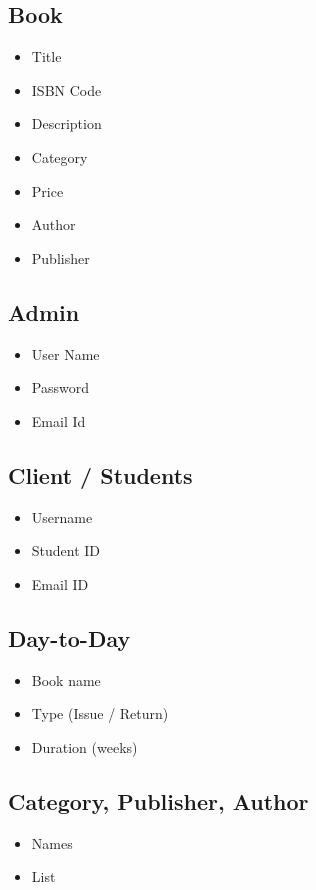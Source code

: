 \documentclass[11pt]{article}
\begin{document}
\subsection{Book}
\label{sec:orge1f6131}
\begin{itemize}
\item Title
\item ISBN Code
\item Description
\item Category
\item Price
\item Author
\item Publisher
\end{itemize}

\subsection{Admin}
\label{sec:orgae946ac}
\begin{itemize}
\item User Name
\item Password
\item Email Id
\end{itemize}

\subsection{Client / Students}
\label{sec:org1ea0c7f}
\begin{itemize}
\item Username
\item Student ID
\item Email ID
\end{itemize}

\subsection{Day-to-Day}
\label{sec:org8918086}
\begin{itemize}
\item Book name
\item Type (Issue / Return)
\item Duration (weeks)
\end{itemize}

\subsection{Category, Publisher, Author}
\label{sec:orga00290e}
\begin{itemize}
\item Names
\item List
\end{itemize}
\end{document}

